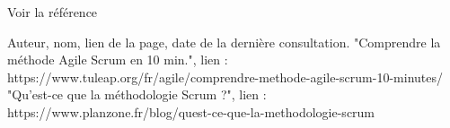 \documentclass{article}
\begin{document}
Voir la référence \cite{maReference1}
        \begin{thebibliography}{10}
                Auteur, nom, lien de la page, date de la dernière consultation.
                "Comprendre la méthode Agile Scrum en 10 min.", lien : https://www.tuleap.org/fr/agile/comprendre-methode-agile-scrum-10-minutes/
                "Qu'est-ce que la méthodologie Scrum ?", lien : https://www.planzone.fr/blog/quest-ce-que-la-methodologie-scrum

    \end{thebibliography}
\end{document}
